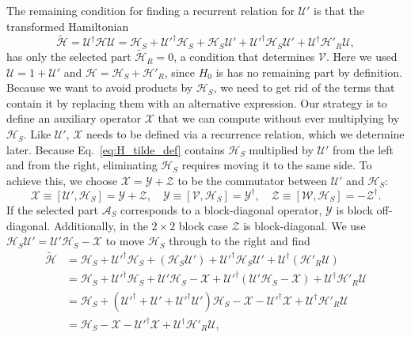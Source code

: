 The remaining condition for finding a recurrent relation for $\mathcal{U}'$ is that the transformed Hamiltonian
%
\begin{equation}
\label{eq:H_tilde_def}
\tilde{\mathcal{H}} = \mathcal{U}^\dagger \mathcal{H} \mathcal{U} = \mathcal{H}_{S} +
\mathcal{U}'^\dagger \mathcal{H}_{S} + \mathcal{H}_{S} \mathcal{U}' + \mathcal{U}'^\dagger \mathcal{H}_{S}
\mathcal{U}' + \mathcal{U}^\dagger\mathcal{H}'_{R}\mathcal{U},
\end{equation}
%
has only the selected part $\tilde{\mathcal{H}}_{R}=0$, a condition that determines $\mathcal{V}$.
Here we used $\mathcal{U}=1+\mathcal{U}'$ and $\mathcal{H} = \mathcal{H}_{S} + \mathcal{H}'_{R}$, since $H_0$ is has no remaining part by definition.
Because we want to avoid products by $\mathcal{H}_{S}$, we need to get rid of the terms that contain it by replacing them with an alternative expression.
Our strategy is to define an auxiliary operator $\mathcal{X}$ that we can compute without ever multiplying by $\mathcal{H}_{S}$.
Like $\mathcal{U}'$, $\mathcal{X}$ needs to be defined via a recurrence relation, which we determine later.
Because Eq.~\eqref{eq:H_tilde_def} contains $\mathcal{H}_{S}$ multiplied by $\mathcal{U}'$ from the left and from the right, eliminating $\mathcal{H}_{S}$ requires moving it to the same side.
To achieve this, we choose $\mathcal{X}=\mathcal{Y}+\mathcal{Z}$ to be the commutator between $\mathcal{U}'$ and $\mathcal{H}_{S}$:
%
\begin{equation}
\label{eq:XYZ}
\mathcal{X} \equiv [\mathcal{U}', \mathcal{H}_{S}] = \mathcal{Y} + \mathcal{Z}, \quad
\mathcal{Y} \equiv [\mathcal{V}, \mathcal{H}_{S}] = \mathcal{Y}^\dagger,\quad
\mathcal{Z} \equiv [\mathcal{W}, \mathcal{H}_{S}] = -\mathcal{Z}^\dagger.
\end{equation}
%
If the selected part $\mathcal{A}_S$ corresponds to a block-diagonal operator, $\mathcal{Y}$ is block off-diagonal.
Additionally, in the $2\times 2$ block case $\mathcal{Z}$ is block-diagonal.
We use $\mathcal{H}_{S} \mathcal{U}' = \mathcal{U}' \mathcal{H}_{S} -\mathcal{X}$ to move $\mathcal{H}_{S}$ through to the right and find
%
\begin{equation}
\label{eq:H_tilde}
\begin{aligned}
  \tilde{\mathcal{H}}
  &= \mathcal{H}_{S} + \mathcal{U}'^\dagger \mathcal{H}_{S} + (\mathcal{H}_{S} \mathcal{U}') + \mathcal{U}'^\dagger \mathcal{H}_{S}
  \mathcal{U}' + \mathcal{U}^\dagger(\mathcal{H}'_{R}\mathcal{U})
  \\
  &= \mathcal{H}_{S} + \mathcal{U}'^\dagger \mathcal{H}_{S} + \mathcal{U}'\mathcal{H}_{S} - \mathcal{X} + \mathcal{U}'^\dagger (\mathcal{U}' \mathcal{H}_{S} - \mathcal{X}) + \mathcal{U}^\dagger\mathcal{H}'_{R}\mathcal{U} \\
  &= \mathcal{H}_{S} + (\mathcal{U}'^\dagger + \mathcal{U}' + \mathcal{U}'^\dagger \mathcal{U}')\mathcal{H}_{S} - \mathcal{X} - \mathcal{U}'^\dagger \mathcal{X} + \mathcal{U}^\dagger\mathcal{H}'_{R}\mathcal{U} \\
  &= \mathcal{H}_{S} - \mathcal{X} - \mathcal{U}'^\dagger \mathcal{X} + \mathcal{U}^\dagger\mathcal{H}'_{R}\mathcal{U},
\end{aligned}
\end{equation}
